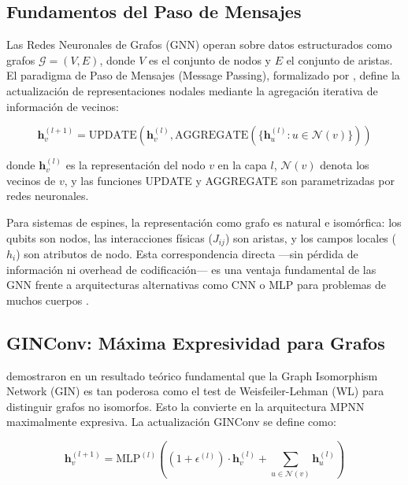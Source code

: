 \documentclass[11pt,a4paper,spanish]{book}
\begin{document}
\subsection{Fundamentos del Paso de Mensajes}

Las Redes Neuronales de Grafos (GNN) operan sobre datos estructurados como grafos $\mathcal{G} = (V, E)$, donde $V$ es el conjunto de nodos y $E$ el conjunto de aristas. El paradigma de Paso de Mensajes (Message Passing), formalizado por \citet{gilmer2017}, define la actualización de representaciones nodales mediante la agregación iterativa de información de vecinos:

\begin{equation}
\mathbf{h}_v^{(l+1)} = \text{UPDATE}\left(\mathbf{h}_v^{(l)}, \text{AGGREGATE}\left(\{\mathbf{h}_u^{(l)} : u \in \mathcal{N}(v)\}\right)\right)
\label{eq:mpnn}
\end{equation}

\noindent donde $\mathbf{h}_v^{(l)}$ es la representación del nodo $v$ en la capa $l$, $\mathcal{N}(v)$ denota los vecinos de $v$, y las funciones UPDATE y AGGREGATE son parametrizadas por redes neuronales.

Para sistemas de espines, la representación como grafo es natural e isomórfica: los qubits son nodos, las interacciones físicas ($J_{ij}$) son aristas, y los campos locales ($h_i$) son atributos de nodo. Esta correspondencia directa ---sin pérdida de información ni overhead de codificación--- es una ventaja fundamental de las GNN frente a arquitecturas alternativas como CNN o MLP para problemas de muchos cuerpos \citep{kochkov2021}.

\subsection{GINConv: Máxima Expresividad para Grafos}

\citet{xu2019} demostraron en un resultado teórico fundamental que la Graph Isomorphism Network (GIN) es tan poderosa como el test de Weisfeiler-Lehman (WL) para distinguir grafos no isomorfos. Esto la convierte en la arquitectura MPNN maximalmente expresiva. La actualización GINConv se define como:

\begin{equation}
\mathbf{h}_v^{(l+1)} = \text{MLP}^{(l)}\left((1 + \epsilon^{(l)}) \cdot \mathbf{h}_v^{(l)} + \sum_{u \in \mathcal{N}(v)} \mathbf{h}_u^{(l)}\right)
\label{eq:ginconv}
\end{equation}
\end{document}
